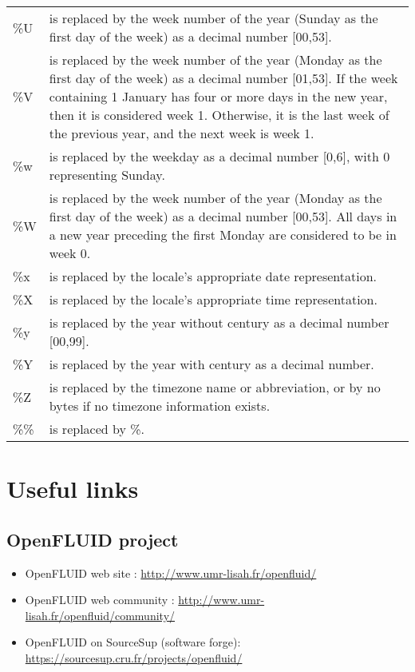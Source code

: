 \begin{center}
\begin{tabularx}{\linewidth}{lX}
\%U & is replaced by the week number of the year (Sunday as the first day of the week) as a decimal number [00,53]. \\
\%V & is replaced by the week number of the year (Monday as the first day of the week) as a decimal number [01,53]. If the week containing 1 January has four or more days in the new year, then it is considered week 1. Otherwise, it is the last week of the previous year, and the next week is week 1. \\
\%w & is replaced by the weekday as a decimal number [0,6], with 0 representing Sunday. \\
\%W & is replaced by the week number of the year (Monday as the first day of the week) as a decimal number [00,53]. All days in a new year preceding the first Monday are considered to be in week 0. \\
\%x & is replaced by the locale's appropriate date representation. \\
\%X & is replaced by the locale's appropriate time representation. \\
\%y & is replaced by the year without century as a decimal number [00,99]. \\
\%Y & is replaced by the year with century as a decimal number. \\
\%Z & is replaced by the timezone name or abbreviation, or by no bytes if no timezone information exists. \\
\%\% & is replaced by \%. \\
\end{tabularx}
\end{center}

\bigskip 

\section{Useful links}

\subsection{OpenFLUID project}

\begin{itemize}
  \item OpenFLUID web site : \textcolor{blue}{\url{http://www.umr-lisah.fr/openfluid/}}  
  \item OpenFLUID web community : \textcolor{blue}{\url{http://www.umr-lisah.fr/openfluid/community/}}
  \item OpenFLUID on SourceSup (software forge): \textcolor{blue}{\url{https://sourcesup.cru.fr/projects/openfluid/}} 
\end{itemize}


